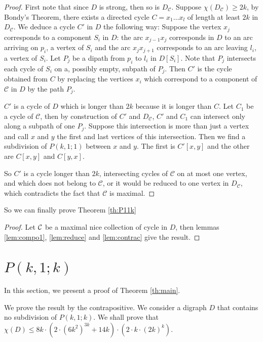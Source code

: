 \documentclass[utf8,10pt]{article}
\theoremstyle{plain}
\theoremstyle{definition}
\theoremstyle{remark}
\newcommand{\cste}{ 8k \cdot (2\cdot \col + 14k) \cdot (2 \cdot \dr)}
\newcommand{\dr}{ k \cdot (2k)^k}
\newcommand{\col}{(6k^2)^{3k}}
\begin{document}
\begin{proof}
First note that since $D$ is strong, then so is $D_{\mathcal{C}}$. Suppose $\chi(D_{\mathcal{C}}) \geq 2k$, by Bondy's Theorem, there exists a directed cycle
$C = x_1\dots x_l$ of length at least $2k$ in $ D_{\mathcal{C}}$. We deduce a cycle $C'$ in $D$ the following way:
Suppose the vertex $x_j$ corresponds to a component $S_i$ in $D$: the arc $x_{j-1}x_j$ corresponds in $D$ to an arc arriving on 
$p_i$, a vertex of $S_i$ and the arc $x_jx_{j+1}$ corresponds to an arc leaving $l_i$, a vertex of $S_i$. Let $P_j$ be a dipath 
from $p_i$ to $l_i$ in $D[S_i]$. Note that $P_j$ intersects each cycle of $S_i$ on a, possibly empty, subpath of $P_j$. 
Then $C'$ is the cycle obtained from $C$ by replacing the vertices $x_i$ which correspond to a component of $\mathcal{C}$ in $D$ by the path $P_j$.

$C'$ is a cycle of $D$ which is longer than $2k$ because it is longer than $C$. Let $C_1$ be a cycle of $\mathcal{C}$, then by construction of $C'$ 
and $D_{\mathcal{C}}$, $C'$ and $C_1$ can intersect only along a subpath of one $P_j$. Suppose this intersection is more than just a vertex and call $x$ and
$y$ the first and last vertices of this intersection. Then we find a subdivision of $P(k,1;1)$ between $x$ and $y$. The first is $C'[x,y]$ and the other are
$C[x,y]$ and $C[y,x]$.

So $C'$ is a cycle longer than $2k$, intersecting cycles of $\mathcal{C}$ on at most one vertex, and which does not belong to $\mathcal{C}$, or it would be reduced
to one vertex in $D_{\mathcal{C}}$, which contradicts the fact that $\mathcal{C}$ is maximal.
\end{proof}

So we can finally prove Theorem \ref{th:P11k}

\begin{proof}
Let ${\cal C}$ be a maximal nice collection of cycle in $D$, then lemmas \ref{lem:compo1}, \ref{lem:reduce} and \ref{lem:contrac} give the result.
\end{proof}


\section{$P(k,1;k)$}

In this section, we present a proof of Theorem \ref{th:main}.

We prove the result by the contrapositive. We consider a digraph $D$ that contains no subdivision of $P(k,1;k)$.
We shall prove that $\chi(D) \leq \cste$.
\end{document}

